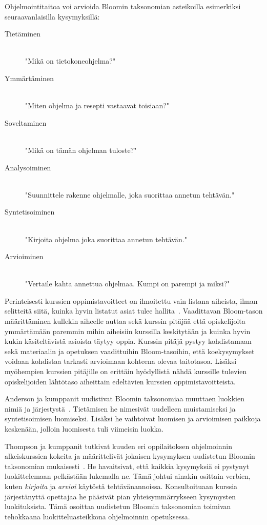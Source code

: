\documentclass[finnish]{../tktltiki2}
\theoremstyle{definition}
\theoremstyle{remark}
\begin{document}
Ohjelmointitaitoa voi arvioida Bloomin taksonomian asteikoilla esimerkiksi seuraavanlaisilla kysymyksillä:

\begin{description}
  \item[Tietäminen] \hfill \\
  "Mikä on tietokoneohjelma?"
  \item[Ymmärtäminen] \hfill \\
  "Miten ohjelma ja resepti vastaavat toisiaan?"
  \item[Soveltaminen] \hfill \\
  "Mikä on tämän ohjelman tuloste?"
  \item[Analysoiminen] \hfill \\
  "Suunnittele rakenne ohjelmalle, joka suorittaa annetun tehtävän."
  \item[Syntetisoiminen] \hfill \\
  "Kirjoita ohjelma joka suorittaa annetun tehtävän."
  \item[Arvioiminen] \hfill \\
  "Vertaile kahta annettua ohjelmaa. Kumpi on parempi ja miksi?"
\end{description}

Perinteisesti kurssien oppimistavoitteet on ilmoitettu vain listana aiheista, ilman selitteitä siitä, kuinka hyvin listatut asiat tulee hallita~\cite{SMS08}. Vaadittavan Bloom-tason määrittäminen kullekin aiheelle auttaa sekä kurssin pitäjää että opiskelijoita ymmärtämään paremmin mihin aiheisiin kurssilla keskitytään ja kuinka hyvin kukin käsiteltävistä asioista täytyy oppia. Kurssin pitäjä pystyy kohdistamaan sekä materiaalin ja opetuksen vaadittuihin Bloom-tasoihin, että koekysymykset voidaan kohdistaa tarkasti arvioimaan kohteena olevaa taitotasoa. Lisäksi myöhempien kurssien pitäjille on erittäin hyödyllistä nähdä kurssille tulevien opiskelijoiden lähtötaso aiheittain edeltävien kurssien oppimistavoitteista.

Anderson ja kumppanit uudistivat Bloomin taksonomiaa muuttaen luokkien nimiä ja järjestystä~\cite{AKA00}. Tietämisen he nimesivät uudelleen muistamiseksi ja syntetisoimisen luomiseksi. Lisäksi he vaihtoivat luomisen ja arvioimisen paikkoja keskenään, jolloin luomisesta tuli viimeisin luokka.

Thompson ja kumppanit tutkivat kuuden eri oppilaitoksen ohjelmoinnin alkeiskurssien kokeita ja määrittelivät jokaisen kysymyksen uudistetun Bloomin taksonomian mukaisesti~\cite{TLW08}. He havaitsivat, että kaikkia kysymyksiä ei pystynyt luokittelemaan pelkästään lukemalla ne. Tämä johtui ainakin osittain verbien, kuten \textit{kirjoita} ja \textit{arvioi} käytöstä tehtävänannoissa. Konsultoituaan kurssia järjestänyttä opettajaa he pääsivät pian yhteisymmärrykseen kysymysten luokituksista. Tämä osoittaa uudistetun Bloomin taksonomian toimivan tehokkaana luokitteluasteikkona ohjelmoinnin opetuksessa.
\end{document}
